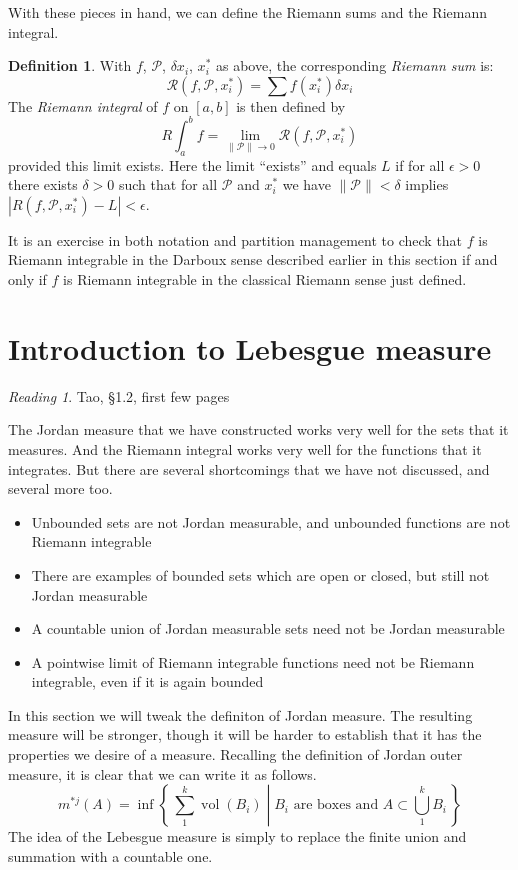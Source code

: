 \documentclass[11pt,oneside]{amsbook}
\newcommand{\set}[1]{\left\{\,#1\,\right\}}
\DeclareMathOperator{\vol}{vol}
\theoremstyle{definition}
\theoremstyle{plain}
\theoremstyle{definition}
\newtheorem{defn}[thm]{Definition}
\theoremstyle{remark}
\newtheorem*{reading}{Reading}
\numberwithin{equation}{section}
\numberwithin{figure}{section}
\begin{document}
With these pieces in hand, we can define the Riemann sums and the Riemann integral.

\begin{defn}
  With $f$, $\mathcal P$, $\delta x_i$, $x_i^*$ as above, the corresponding \emph{Riemann sum} is:
  \[\mathcal R(f,\mathcal  P,x_i^*)=\sum f(x_i^*)\delta x_i
  \]
  The \emph{Riemann integral} of $f$ on $[a,b]$ is then defined by
  \[R\int_a^b f=\lim_{\|\mathcal P\|\to0}\mathcal R(f,\mathcal P,x_i^*)
  \]
  provided this limit exists. Here the limit ``exists'' and equals $L$ if for all $\epsilon>0$ there exists $\delta>0$ such that for all $\mathcal P$ and $x_i^*$ we have $\|\mathcal P\|<\delta$ implies $|R(f,\mathcal P,x_i^*)-L|<\epsilon$.
\end{defn}

It is an exercise in both notation and partition management to check that $f$ is Riemann integrable in the Darboux sense described earlier in this section if and only if $f$ is Riemann integrable in the classical Riemann sense just defined.

\newpage
\section{Introduction to Lebesgue measure}

\begin{reading}
  Tao, \S1.2, first few pages
\end{reading}

The Jordan measure that we have constructed works very well for the sets that it measures. And the Riemann integral works very well for the functions that it integrates. But there are several shortcomings that we have not discussed, and several more too.
\begin{itemize}
\item Unbounded sets are not Jordan measurable, and unbounded functions are not Riemann integrable
\item There are examples of bounded sets which are open or closed, but still not Jordan measurable
\item A countable union of Jordan measurable sets need not be Jordan measurable
\item A pointwise limit of Riemann integrable functions need not be Riemann integrable, even if it is again bounded
\end{itemize}

In this section we will tweak the definiton of Jordan measure. The resulting measure will be stronger, though it will be harder to establish that it has the properties we desire of a measure. Recalling the definition of Jordan outer measure, it is clear that we can write it as follows.
\[m^{*j}(A)=\inf\set{\left.\sum_1^k \vol(B_i)\;\right|\;\text{$B_i$ are boxes and }A\subset\bigcup_1^kB_i}
\]
The idea of the Lebesgue measure is simply to replace the finite union and summation with a countable one.
\end{document}
